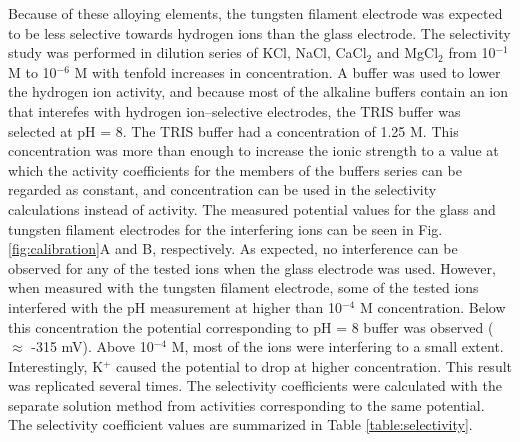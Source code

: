 \documentclass[manuscript=article, journal=jceda8]{achemso}
\begin{document}
Because of these alloying elements, the tungsten filament electrode was expected to be less selective towards hydrogen ions than the glass electrode. The selectivity study was performed in dilution series of KCl, NaCl, CaCl$_2$ and MgCl$_2$ from 10$^{-1}$ M to 10$^{-6}$ M with tenfold increases in concentration. A buffer was used to lower the hydrogen ion activity, and because most of the alkaline buffers contain an ion that interefes with hydrogen ion--selective electrodes, the TRIS buffer was selected at pH = 8. The
TRIS buffer had a concentration of 1.25 M. This concentration was more than enough to increase the ionic strength to a value at which the activity coefficients for the members of the buffers series can be regarded as constant, and concentration can be used in the selectivity calculations instead of activity. The measured potential values for the glass and tungsten filament electrodes for the interfering ions can be seen in Fig. \ref{fig:calibration}A and B, respectively. As expected, no interference can be observed for any of the tested ions when the glass electrode was used. However, when measured with the tungsten filament electrode, some of the tested ions interfered with the pH measurement at higher than 10$^{-4}$ M concentration. Below this concentration the potential corresponding to pH = 8 buffer was observed ($\approx$ -315 mV). Above 10$^{-4}$ M, most of the ions were interfering to a small extent. Interestingly, K$^+$ caused the potential to drop at higher concentration. This result was replicated several times. The selectivity coefficients were calculated with the separate solution method from activities corresponding to the same potential. The selectivity coefficient values are summarized in Table \ref{table:selectivity}.
\end{document}
